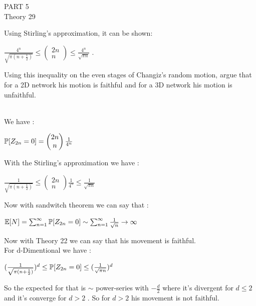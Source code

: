 \documentclass[30pt]{article}
\begin{document}
\newpage
{\LARGE \color{blue} PART 5}\\
{\Large \color{blue} Theory 29 } \\
{\color{blue} Using Stirling's approximation, it can be shown: 
\begin{center}
    $\frac{4^n}{\sqrt{\pi (n+\frac{1}{2})}} \le \begin{pmatrix}
        2n \\ n
    \end{pmatrix} \le \frac{4^n}{\sqrt{\pi n}} $ .
\end{center} 
Using this inequality on the even stages of Changiz's random motion, argue that for a 2D network his motion is faithful and for a 3D network his motion is unfaithful.
} \\ \newline 
We have : 
\begin{center}
    $\Bbb{P}[Z_{2n} = 0] = \begin{pmatrix}
        2n \\ n
    \end{pmatrix} \frac{1}{4^n} $
\end{center}
With the Stirling's approximation we have : 
\begin{center}
    $\frac{1}{\sqrt{\pi (n+\frac{1}{2})}} \le \begin{pmatrix}
        2n \\ n
    \end{pmatrix} \frac{1}{4^n} \le \frac{1}{\sqrt{\pi n}} $
\end{center} 
Now with sandwitch theorem we can say that : 
\begin{center}
    $\Bbb{E}[N] = \sum_{n=1}^{\infty} \Bbb{P}[Z_{2n} = 0] \sim \sum_{n=1}^{\infty} \frac{1}{\sqrt{n}}   \rightarrow \infty$
\end{center} 
Now with {\color{blue} Theory 22} we can say that his movement is faithful. \\
For d-Dimentional we have : \\
\begin{center}
    $(\frac{1}{\sqrt{\pi (n+\frac{1}{2})}})^d \le \Bbb{P}[Z_{2n} = 0] \le (\frac{1}{\sqrt{\pi n}})^d $
\end{center} 
So the expected for that is $\sim $ power-series with $-\frac{d}{2}$ where it's divergent for $d \le 2 $ and it's converge for $d >2 $ . So for $d>2 $ his movement is not faithful. \\
\end{document}
